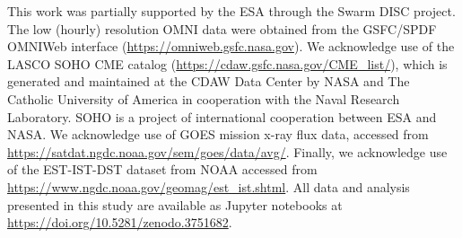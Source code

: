 \documentclass[draft,linenumbers]{agujournal2018}
\begin{document}
%




%
%
%
%
%
%
%
%


\acknowledgments
This work was partially supported by the ESA through the Swarm DISC project. The low (hourly) resolution OMNI data were obtained from the GSFC/SPDF OMNIWeb interface (\url{https://omniweb.gsfc.nasa.gov}). We acknowledge use of the LASCO SOHO CME catalog (\url{https://cdaw.gsfc.nasa.gov/CME\_list/}), which is generated and maintained at the CDAW Data Center by NASA and The Catholic University of America in cooperation with the Naval Research Laboratory. SOHO is a project of international cooperation between ESA and NASA. We acknowledge use of GOES mission x-ray flux data, accessed from \url{https://satdat.ngdc.noaa.gov/sem/goes/data/avg/}. Finally, we acknowledge use of the EST-IST-DST dataset from NOAA accessed from \url{https://www.ngdc.noaa.gov/geomag/est\_ist.shtml}. All data and analysis presented in this study are available as Jupyter notebooks at \url{https://doi.org/10.5281/zenodo.3751682}.



%

%





\end{document}
